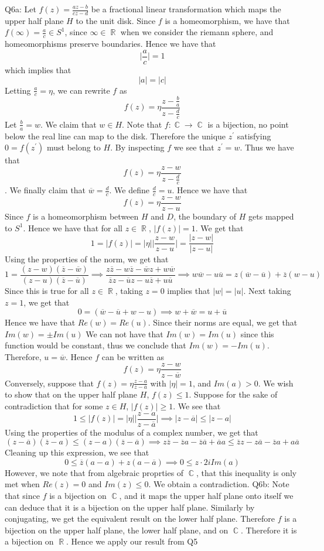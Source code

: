 \documentclass[letterpaper]{article}
\DeclareMathOperator{\R}{\mathbb{R}}
\DeclareMathOperator{\C}{\mathbb{C}}
\newcommand{\ol}{\overline}
\newcommand{\ci}{i}
\begin{document}
\noindent
Q6a: Let $f(z) = \frac{az- b}{cz-d}$ be a fractional linear transformation which maps the upper half plane $H$ to the unit disk. Since $f$ is a homeomorphism, we have that $f(\infty) = \frac{a}{c} \in S^1$, since $\infty \in \R$ when we consider the riemann sphere, and homeomorphisms preserve boundaries. Hence we have that $$\Big| \frac{a}{c} \Big| = 1$$ which implies that $$|a| = |c|$$ Letting $\frac{a}{c} = \eta$, we can rewrite $f$ as $$f(z) = \eta \frac{z-\frac{b}{a}}{z - \frac{d}{c}}$$
Let $\frac{b}{a} = w$. We claim that $w\in H$. Note that $f: \C \to \C$ is a bijection, no point below the real line can map to the disk. Therefore the unique $z^\prime$ satisfying $0 = f(z^\prime)$ must belong to $H$. By inspecting $f$ we see that $z^\prime = w$. Thus we have that $$f(z) = \eta \frac{z-w}{z- \frac{d}{c}}$$. We finally claim that $\ol{w} = \frac{d}{c}$. We define $\frac{d}{c}=u$. Hence we have that $$f(z) = \eta \frac{z-w}{z-u}$$ 
Since $f$ is a homeomorphism between $H$ and $D$, the boundary of $H$ gets mapped to $S^1$. Hence we have that for all $z\in \R$, $|f(z)|=1$. We get that 
$$1 = |f(z)| = |\eta | \Big|\frac{z - w}{z-u} \Big| = \frac{|z-w|}{|z-u|}$$
Using the properties of the norm, we get that $$1= \frac{(z-w)(\ol{z} - \ol{w})}{(z-u)(\ol{z} - \ol{u})} \implies \frac{z \ol{z} - w\ol{z} - \ol{w}z + w\ol{w}}{\ol{z}z - \ol{u}z - u\ol{z} + u \ol{u}} \implies w\ol{w} - u\ol{u} = z(\ol{w} - \ol{u}) + \ol{z}(w-u)$$
Since this is true for all $z\in \R$, taking $z=0$ implies that $|w| = |u|$. Next taking $z=1$, we get that $$ 0 = (\ol{w} - \ol{u} + w-u) \implies w+ \ol{w} = u + \ol{u}$$ Hence we have that $Re(w) = Re(u)$. Since their norms are equal, we get that $Im(w) = \pm Im(u)$ We can not have that $Im(w) = Im(u)$ since this function would be constant, thus we conclude that $Im(w) = -Im(u)$. Therefore, $u = \ol{w}$. 
Hence $f$ can be written as $$f(z) = \eta \frac{z-w}{z-\ol{w}}$$
Conversely, suppose that $f(z)= \eta \frac{z-a}{z - \ol{a}} $ with $|\eta| =1$, and $Im(a)>0$. We wish to show that on the upper half plane $H$, $f(z)\leq 1$. Suppose for the sake of contradiction that for some $z\in H$, $|f(z)| \geq 1$. We see that 
$$1 \leq |f(z)| = |\eta| \Big| \frac{z-a}{z- \ol{a}} \Big| \implies |z-\ol{a}| \leq |z-a|$$
Using the properties of the modulus of a complex number, we get that 
$$(z-\ol{a})(\ol{z}-a) \leq (z-a)(\ol{z} - \ol{a}) \implies z\ol{z} - \ol{z}a - \ol{z}\ol{a} + \ol{a}a \leq \ol{z}z - z\ol{a} - \ol{z}a + a \ol{a}$$
Cleaning up this expression, we see that 
$$0\leq \ol{z} ( a-a) + z(a -\ol{a}) \implies 0\leq z \cdot 2\ci Im(a)$$
However, we note that from algebraic proprties of $\C$, that this inequality is only met when $Re(z) =0$ and $Im(z)\leq 0$. We obtain a contradiction. 
\newpage 
\noindent
Q6b: Note that since $f$ is a bijection on $\C$, and it maps the upper half plane onto itself we can deduce that it is a bijection on the upper half plane. Similarly by conjugating, we get the equivalent result on the lower half plane. Therefore $f$ is a bijection on the upper half plane, the lower half plane, and on $\C$. Therefore it is a bijection on $\R$. Hence we apply our result from Q5
\end{document}
